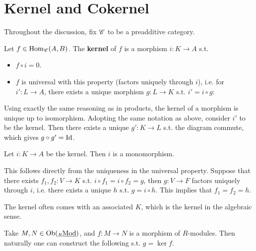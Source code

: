 \documentclass{article}
\begin{document}
\section{Kernel and Cokernel}

Throughout the discussion, fix $\mathscr{C}$ to be a preadditive category. 

\begin{definition}[Kernel]
    Let $f\in \mathrm{Hom}_{\mathscr{C}}(A, B)$. The \textbf{kernel} of $f$ is a morphism $i: K \to A$ s.t.
    \begin{itemize}
        \item $f \circ i = 0$.
        \item $f$ is universal with this property (factors uniquely through $i$), i.e. for $i': L \to A$, there exists a unique morphism $g: L \to K$ s.t. $i' = i \circ g$:
        \begin{figure}[htbp]
            \centering
        \end{figure}
    \end{itemize} 
\end{definition}

\begin{remark}
    Using exactly the same reasoning as in products, the kernel of a morphism is unique up to isomorphism. Adopting the same notation as above, consider $i'$ to be the kernel. Then there exists a unique $g': K \to L$ s.t. the diagram commute, which gives $g \circ g' = \mathrm{Id}$.
\end{remark}

\begin{remark}
    Let $i: K \to A$ be the kernel. Then $i$ is a monomorphism.

    This follows directly from the uniqueness in the universal property. Suppose that there exists $f_1, f_2: V \to K$ s.t. $i \circ f_1 = i \circ f_2 = g$, then $g: V \to F$ factors uniquely through $i$, i.e. there exists a unique $h$ s.t. $g = i \circ h$. This implies that $f_1 = f_2 = h$.
\end{remark}

\begin{example}
    The kernel often comes with an associated $K$, which is the kernel in the algebraic sense.

    Take $M, N \in \mathrm{Ob}({}_{R}\underline{\textup{Mod}})$, and $f: M \to N$ is a morphism of $R$-modules. Then naturally one can construct the following s.t. $g = \ker f$.
    \begin{figure}[htbp]
        \centering
    \end{figure}
\end{example}
\end{document}
